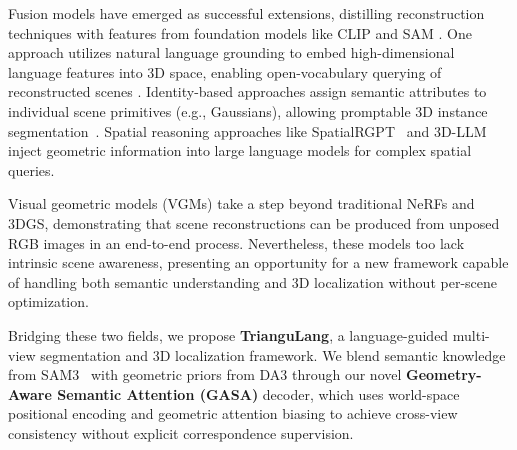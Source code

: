 Fusion models have emerged as successful extensions, distilling reconstruction techniques with features from foundation models like CLIP \cite{clip} and SAM \cite{sam}. One approach utilizes natural language grounding to embed high-dimensional language features into 3D space, enabling open-vocabulary querying of reconstructed scenes \cite{lerf, langsplatv2, openscene3d, fmgs}. Identity-based approaches assign semantic attributes to individual scene primitives (e.g., Gaussians), allowing promptable 3D instance segmentation~\cite{gaussiangrouping, SAGA, refersplat}. Spatial reasoning approaches like SpatialRGPT~\cite{spatialrgpt} and 3D-LLM~\cite{3dllm} inject geometric information into large language models for complex spatial queries.


Visual geometric models (VGMs) \cite{da3, pi3, dust3r, VGGT} take a step beyond traditional NeRFs and 3DGS, demonstrating that scene reconstructions can be produced from unposed RGB images in an end-to-end process.
Nevertheless, these models too lack intrinsic scene awareness, presenting an opportunity for a new framework capable of handling both semantic understanding and 3D localization without per-scene optimization.







Bridging these two fields, we propose \textbf{TrianguLang}, a language-guided multi-view segmentation and 3D localization framework. We blend semantic knowledge from SAM3~\cite{sam3} with geometric priors from DA3 through our novel \textbf{Geometry-Aware Semantic Attention (GASA)} decoder, which uses world-space positional encoding and geometric attention biasing to achieve cross-view consistency without explicit correspondence supervision.

